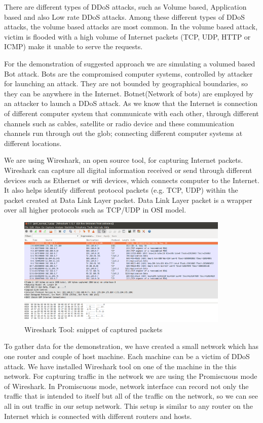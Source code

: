 \documentclass[10pt,oneside,a4paper]{article}
\begin{document}
There are different types of DDoS attacks, such as Volume based, Application based and also Low rate DDoS attacks. Among these different types of DDoS attacks, the volume based attacks are most common. In the volume based attack, victim is flooded with a high volume of Internet packets (TCP, UDP, HTTP or ICMP) make it unable to serve the requests.

For the demonstration of suggested approach we are simulating a volumed based Bot attack. Bots are the compromised computer systems, controlled by attacker for launching an attack. They are not bounded by geographical boundaries, so they can be anywhere in the Internet. Botnet(Network  of bots) are employed by an attacker to launch a DDoS attack. As we know that the Internet is connection of different computer system that communicate with each other, through different channels such as cables, satellite or radio device and these communication channels run through out the glob; connecting different computer systems at different locations.

We are using Wireshark, an open source tool, for capturing Internet packets. Wireshark can capture all digital information received or send through different devices such as Ethernet or wifi devices, which connects computer to the Internet. It also helps identify different protocol packets (e.g. TCP, UDP) within the packet created at Data Link Layer packet. Data Link Layer packet is a wrapper over all higher protocols such as TCP/UDP in OSI model.\par

\begin{figure}[H]
\centering
\includegraphics[width=0.90\textwidth]{Wireshark_Tools.png}
\caption{Wireshark Tool: snippet of captured packets} \label{fig:wireshark}
\end{figure}

To gather data for the demonstration, we have created a small network which has one router and couple of host machine. Each machine can be a victim of DDoS attack. We have installed Wireshark tool on one of the machine in the this network. For capturing traffic in the network we are using the Promiscuous mode of Wireshark. In Promiscuous mode, network interface can record not only the traffic that is intended to itself but all of the traffic on the network, so we can see all in out traffic in our setup network. This setup is similar to any router on the Internet which is connected with different routers and hosts.
\end{document}
